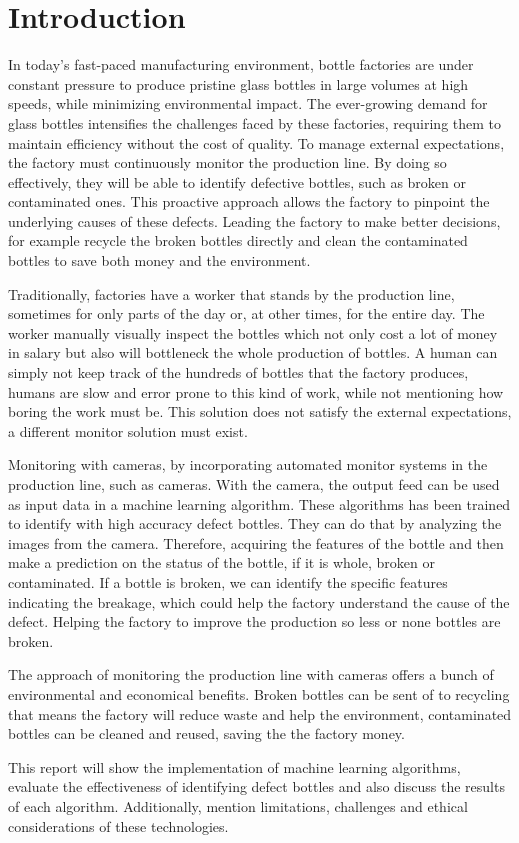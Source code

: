 \section{Introduction}

In today’s fast-paced manufacturing environment, bottle factories are under constant pressure to produce pristine glass bottles in large volumes at high speeds, while minimizing environmental impact. 
The ever-growing demand for glass bottles \cite{ReturnableBottles} intensifies the challenges faced by these factories, requiring them to maintain efficiency without the cost of quality.  
To manage external expectations, the factory must continuously monitor the production line. By doing so effectively, they will be able to identify defective bottles, such as broken or contaminated ones. This proactive approach allows the factory to pinpoint the underlying causes of these defects.
Leading the factory to make better decisions, for example recycle the broken bottles directly and clean the contaminated bottles to save both money and the environment.
\par
Traditionally, factories have a worker that stands by the production line, sometimes for only parts of the day or, at other times, for the entire day. 
The worker manually visually inspect the bottles which not only cost a lot of money in salary but also will bottleneck the whole production of bottles.
A human can simply not keep track of the hundreds of bottles that the factory produces, humans are slow and error prone to this kind of work, while not mentioning how boring the work must be. 
This solution does not satisfy the external expectations, a different monitor solution must exist.
\par
Monitoring with cameras, by incorporating automated monitor systems in the production line, such as cameras. 
With the camera, the output feed can be used as input data in a machine learning algorithm. 
These algorithms has been trained to identify with high accuracy defect bottles. 
They can do that by analyzing the images from the camera.
Therefore, acquiring the features of the bottle and then make a prediction on the status of the bottle, if it is whole, broken or contaminated.
If a bottle is broken, we can identify the specific features indicating the breakage, which could help the factory understand the cause of the defect.
Helping the factory to improve the production so less or none bottles are broken. 
\par
The approach of monitoring the production line with cameras offers a bunch of environmental and economical benefits.
Broken bottles can be sent of to recycling that means the factory will reduce waste and help the environment, contaminated bottles can be cleaned and reused, saving the the factory money.
\par
This report will show the implementation of machine learning algorithms, evaluate the effectiveness of identifying defect bottles and also discuss the results of each algorithm.
Additionally, mention limitations, challenges and ethical considerations of these technologies.

